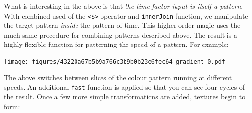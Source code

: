 \documentclass[
]{article}
\newenvironment{Shaded}{\begin{snugshade}}{\end{snugshade}}
\newcommand{\DecValTok}[1]{\textcolor[rgb]{0.00,0.00,0.81}{#1}}
\newcommand{\FloatTok}[1]{\textcolor[rgb]{0.00,0.00,0.81}{#1}}
\newcommand{\NormalTok}[1]{#1}
\newcommand{\OperatorTok}[1]{\textcolor[rgb]{0.81,0.36,0.00}{\textbf{#1}}}
\newcommand{\OtherTok}[1]{\textcolor[rgb]{0.56,0.35,0.01}{#1}}
\newcommand{\StringTok}[1]{\textcolor[rgb]{0.31,0.60,0.02}{#1}}
\begin{document}
\begin{Shaded}
\end{Shaded}

What is interesting in the above is that \emph{the time factor input is
itself a pattern}. With combined used of the
\texttt{\textless{}\$\textgreater{}} operator and \texttt{innerJoin}
function, we manipulate the target pattern \emph{inside} the pattern of
time. This higher order magic uses the much same procedure for combining
patterns described above. The result is a highly flexible function for
patterning the speed of a pattern. For example:

\begin{Shaded}
\end{Shaded}

\texttt{[image: figures/43220a67b5b9a766c3b9b0b23e6fec64\_gradient\_0.pdf]}

The above switches between slices of the colour pattern running at
different speeds. An additional \texttt{fast} function is applied so
that you can see four cycles of the result. Once a few more simple
transformations are added, textures begin to form:

\begin{Shaded}
\end{Shaded}
\end{document}
